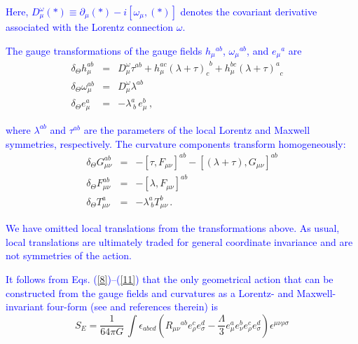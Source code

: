 \documentclass [prd,reprint,eqsecnum,nofootinbib]  {revtex4-1}
\newcommand{\corr}[1]{\textcolor{blue}{#1}}
\begin{document}
\corr{Here, $D^\omega_\mu(\ast)\equiv
\partial_\mu(\ast)-i[\omega_\mu,(\ast)]$ denotes the covariant
derivative associated with the Lorentz connection $\omega$.}



\corr{The gauge transformations of the gauge fields
$h_\mu{}^{ab}$, $\omega_\mu{}^{ab}$, and $e_\mu{}^a$ are}
\begin{eqnarray}

        \delta_\Theta h^{ab}_{\mu}&=&D^\omega_\mu \tau^{ab}+

h^{ac}_\mu(\lambda+\tau)_{c}^{\;\,b}+h^{bc}_\mu(\lambda+\tau)^{a}_{\;\;c}\label{6}\quad\\

      \delta_\Theta \omega^{ab}_{\mu}&=& D^\omega_\mu \lambda^{ab}

      \label{7}\\

   \delta_\Theta e^{a}_{\mu}&=&-\lambda^a_{\;b}

    \,e^b_\mu\,,\label{8}

\end{eqnarray}

\corr{where $\lambda^{ab}$ and $\tau^{ab}$ are the parameters of the
local Lorentz and Maxwell symmetries, respectively. The curvature
components transform homogeneously:}
\begin{eqnarray}

        \delta_\Theta G^{ab}_{\mu\nu}&=&-[\tau,F_{\mu\nu}]^{ab}-[(\lambda+\tau),G_{\mu\nu}]^{ab}\label{9}\\

      \delta_\Theta F^{ab}_{\mu\nu}&=&-[\lambda,F_{\mu\nu}]^{ab}  \label{10}\\

    \delta_\Theta

    T^{a}_{\mu\nu}&=&-\lambda^a_{\;b}T^b_{\mu\nu}\,.\label{11}

\end{eqnarray}

\corr{We have omitted local translations from the transformations above.
As usual, local translations are ultimately traded for general
coordinate invariance and are not symmetries of the action.}

\corr{It follows from Eqs. (\ref{8})--(\ref{11}) that the only
geometrical action that can be constructed from the gauge fields and
curvatures as a Lorentz- and Maxwell-invariant four-form (see
\cite{Durka:2011nf} and references therein) is}
\begin{equation}

S_{E} =\frac1{64\pi G}\,

\int\epsilon_{abcd}\left(R_{\mu\nu}{}^{ab}e_{\rho}^{c}e_{\sigma}^{d}

-\frac{\Lambda}{3}e_{\mu}^{a}e_{\nu}^{b}e_{\rho}^{ c}e_{\sigma}^{

d}\right)\epsilon^{\mu\nu\rho\sigma}\label{12}

\end{equation}
\end{document}

